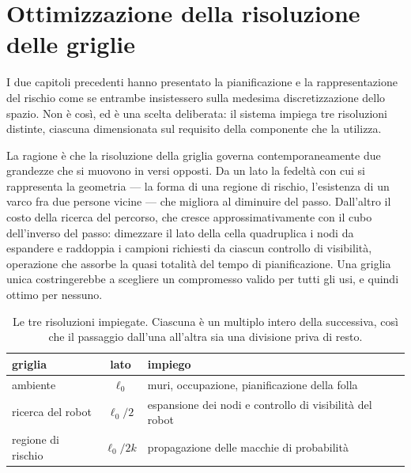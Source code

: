 %

\section{Ottimizzazione della risoluzione delle griglie}
\label{cap:ottimizzazione-griglie}

I due capitoli precedenti hanno presentato la pianificazione e la rappresentazione del rischio
come se entrambe insistessero sulla medesima discretizzazione dello spazio. Non è così, ed è una
scelta deliberata: il sistema impiega tre risoluzioni distinte, ciascuna dimensionata sul
requisito della componente che la utilizza.

La ragione è che la risoluzione della griglia governa contemporaneamente due grandezze che si
muovono in versi opposti. Da un lato la fedeltà con cui si rappresenta la geometria — la forma
di una regione di rischio, l'esistenza di un varco fra due persone vicine — che migliora al
diminuire del passo. Dall'altro il costo della ricerca del percorso, che cresce
approssimativamente con il cubo dell'inverso del passo: dimezzare il lato della cella
quadruplica i nodi da espandere e raddoppia i campioni richiesti da ciascun controllo di
visibilità, operazione che assorbe la quasi totalità del tempo di pianificazione. Una griglia
unica costringerebbe a scegliere un compromesso valido per tutti gli usi, e quindi ottimo per
nessuno.

\begin{table}[h]
\centering
\begin{tabular}{lcl}
\hline
griglia & lato & impiego \\
\hline
ambiente & $\ell_0$ & muri, occupazione, pianificazione della folla \\
ricerca del robot & $\ell_0/2$ & espansione dei nodi e controllo di visibilità del robot \\
regione di rischio & $\ell_0/2k$ & propagazione delle macchie di probabilità \\
\hline
\end{tabular}
\caption{Le tre risoluzioni impiegate. Ciascuna è un multiplo intero della successiva, così che
il passaggio dall'una all'altra sia una divisione priva di resto.}
\label{tab:tre-risoluzioni}
\end{table}

